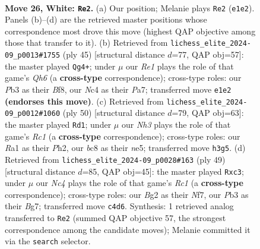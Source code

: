 \documentclass[11pt]{article}
\begin{document}
\begin{figure}[p]
\label{fig:thought-m48}
\end{figure}

\clearpage

\begin{figure}[p]\centering
\begin{subfigure}{0.46\textwidth}\centering
\resizebox{\linewidth}{!}{%
\newchessgame
\chessboard[
  setfen={2b5/5pkp/rp3np1/2q5/PpN5/1P4PN/5PBP/R3R1K1 w - - 2 26},
  showmover=false,
  pgfstyle=straightmove, color=movearrow, markmove={e1-e2}
]}
\caption{}
\end{subfigure}\hfill
\begin{subfigure}{0.46\textwidth}\centering
\resizebox{\linewidth}{!}{%
\newchessgame
\chessboard[
  setfen={5b2/p1rkn3/2p2p2/3pp3/Q3P3/1P4Bq/P2NKP2/2R5 b - - 0 23},
  showmover=false,
  pgfstyle=straightmove, color=movearrow, markmove={h3-g4}
]}
\caption{}
\end{subfigure}
\\[4pt]
\begin{subfigure}{0.46\textwidth}\centering
\resizebox{\linewidth}{!}{%
\newchessgame
\chessboard[
  setfen={6k1/5pbp/1q2p1p1/pN2n3/P1P5/BP1r4/4QPPP/2R3K1 w - - 0 26},
  showmover=false,
  pgfstyle=straightmove, color=movearrow, markmove={c1-d1}
]}
\caption{}
\end{subfigure}\hfill
\begin{subfigure}{0.46\textwidth}\centering
\resizebox{\linewidth}{!}{%
\newchessgame
\chessboard[
  setfen={2rr2k1/5nbp/p2p2p1/1p2p3/1P4P1/N1Q1B2P/P4PK1/3R1R2 b - - 0 25},
  showmover=false,
  pgfstyle=straightmove, color=movearrow, markmove={c8-c3}
]}
\caption{}
\end{subfigure}
\caption{\textbf{Move 26, White: \texttt{Re2}.} (a) Our position; Melanie plays \texttt{Re2} (\texttt{e1e2}). Panels (b)--(d) are the retrieved master positions whose correspondence most drove this move (highest QAP objective among those that transfer to it). (b) Retrieved from \texttt{lichess\_elite\_2024-09\_p0013\#1755} (ply 45) [structural distance $d$=77, QAP obj=57]: the master played \texttt{Qg4+}; under $\mu$ our \emph{Re1} plays the role of that game's \emph{Qh6} (a \textbf{cross-type} correspondence); cross-type roles: our \emph{P}b3 as their \emph{B}f8, our \emph{N}c4 as their \emph{P}a7; transferred move \texttt{e1e2} \textbf{(endorses this move)}. (c) Retrieved from \texttt{lichess\_elite\_2024-09\_p0012\#1060} (ply 50) [structural distance $d$=79, QAP obj=63]: the master played \texttt{Rd1}; under $\mu$ our \emph{Nh3} plays the role of that game's \emph{Rc1} (a \textbf{cross-type} correspondence); cross-type roles: our \emph{R}a1 as their \emph{P}h2, our \emph{b}c8 as their \emph{n}e5; transferred move \texttt{h3g5}. (d) Retrieved from \texttt{lichess\_elite\_2024-09\_p0028\#163} (ply 49) [structural distance $d$=85, QAP obj=45]: the master played \texttt{Rxc3}; under $\mu$ our \emph{Nc4} plays the role of that game's \emph{Rc1} (a \textbf{cross-type} correspondence); cross-type roles: our \emph{B}g2 as their \emph{N}f7, our \emph{P}b3 as their \emph{B}g7; transferred move \texttt{c4d6}. Synthesis: 1 retrieved analog transferred to \texttt{Re2} (summed QAP objective 57, the strongest correspondence among the candidate moves); Melanie committed it via the \texttt{search} selector.}

\end{figure}
\end{document}
